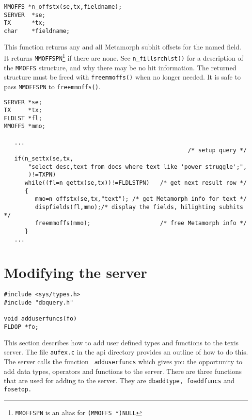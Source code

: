 \SYNOPSIS
\begin{verbatim}
MMOFFS *n_offstx(se,tx,fieldname);
SERVER  *se;
TX      *tx;
char    *fieldname;
\end{verbatim}

\DESCRIPTION

This function returns any and all Metamorph subhit offsets for the named
field.  It returns \verb`MMOFFSPN`\footnote{\verb`MMOFFSPN` is an alias
for \verb`(MMOFFS *)NULL`} if there are none.  See
\verb`n_fillsrchlst()` for a description of the \verb`MMOFFS` structure,
and why there may be no hit information.
The returned structure must be freed with \verb`freemmoffs()` when no
longer needed. It is safe to pass \verb`MMOFFSPN` to \verb`freemmoffs()`.

\EXAMPLE
\begin{verbatim}
SERVER *se;
TX     *tx;
FLDLST *fl;
MMOFFS *mmo;

   ...
                                                     /* setup query */
   if(n_settx(se,tx,
       "select desc,text from docs where text like 'power struggle';",
       )!=TXPN)
      while((fl=n_gettx(se,tx))!=FLDLSTPN)   /* get next result row */
      {
         mmo=n_offstx(se,tx,"text"); /* get Metamorph info for text */
         dispfields(fl,mmo);/* display the fields, hilighting subhits */
         freemmoffs(mmo);                    /* free Metamorph info */
      }
   ...
\end{verbatim}


\newpage\section{Modifying the server}


\SYNOPSIS
\begin{verbatim}
#include <sys/types.h>
#include "dbquery.h"

void adduserfuncs(fo)
FLDOP *fo;
\end{verbatim}

\DESCRIPTION

This section describes how to add user defined types and functions to the
texis server. The file {\tt aufex.c} in the api directory provides an
outline of how to do this.  The server calls the function {\tt
adduserfuncs} which gives you the opportunity to add data types, operators
and functions to the server.  There are three functions that are used for
adding to the server. They are {\tt dbaddtype, foaddfuncs} and {\tt
fosetop.}


